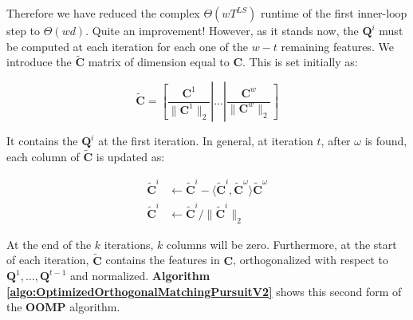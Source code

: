 \documentclass[12pt,a4paper,oneside,english]{UPBThesis}
\begin{document}
Therefore we have reduced the complex $\Theta(wT^{LS})$ runtime of the first inner-loop step to $\Theta(wd)$. Quite an improvement! However, as it stands now, the $\textbf{Q}^i$ must be computed at each iteration for each one of the $w - t$ remaining features. We introduce the $\tilde{\textbf{C}}$ matrix of dimension equal to $\textbf{C}$. This is set initially as:

\begin{equation*}
\tilde{\textbf{C}} = \left[ \frac{\textbf{C}^1}{\|\textbf{C}^1\|_2} \left|\right. \dots \left|\right. \frac{\textbf{C}^w}{\|\textbf{C}^w\|_2} \right]
\end{equation*}

It contains the $\textbf{Q}^i$ at the first iteration. In general, at iteration $t$, after $\omega$ is found, each column of $\tilde{\textbf{C}}$ is updated as:

\begin{align*}
\tilde{\textbf{C}}^i & \gets \tilde{\textbf{C}}^i - \langle \tilde{\textbf{C}}^i, \tilde{\textbf{C}}^\omega \rangle \tilde{\textbf{C}}^\omega \\
\tilde{\textbf{C}}^i & \gets \tilde{\textbf{C}}^i / \| \tilde{\textbf{C}}^i \|_2
\end{align*}

At the end of the $k$ iterations, $k$ columns will be zero. Furthermore, at the start of each iteration, $\tilde{\textbf{C}}$ contains the features in $\textbf{C}$, orthogonalized with respect to $\textbf{Q}^1, \dots, \textbf{Q}^{t-1}$ and normalized. \textbf{Algorithm \ref{algo:OptimizedOrthogonalMatchingPursuitV2}} shows this second form of the \textbf{OOMP} algorithm.
\end{document}

